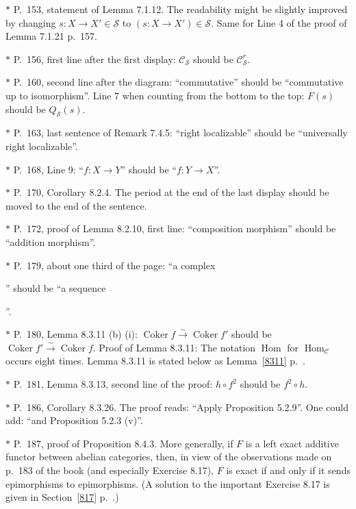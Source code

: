 \documentclass[12pt]{article}
\theoremstyle{remark}
\theoremstyle{definition}
\newcommand{\nn}{\noindent}
\newcommand{\cc}{\mathcal}
\newcommand{\C}{\mathcal C}
\newcommand{\xr}{\xrightarrow}
\DeclareMathOperator{\Coker}{Coker}
\DeclareMathOperator{\Hom}{Hom}
\begin{document}
\nn$*$ P.~153, statement of Lemma 7.1.12. The readability might be slightly improved by changing $s:X\to X'\in\mathcal S$ to $(s:X\to X')\in\mathcal S$. Same for Line 4 of the proof of Lemma 7.1.21 p.~157.

\nn$*$ P.~156, first line after the first display: $\C_{\cc S}$ should be $\C_{\cc S}^r$.

\nn$*$ P.~160, second line after the diagram: ``commutative'' should be ``commutative up to isomorphism''. Line 7 when counting from the bottom to the top: $F(s)$ should be $Q_{\mathcal S}(s)$.

\nn$*$ P.~163, last sentence of Remark 7.4.5: ``right localizable'' should be ``universally right localizable''.

\nn$*$ P.~168, Line 9: ``$f:X\to Y$'' should be ``$f:Y\to X$''.

\nn$*$ P.~170, Corollary 8.2.4. The period at the end of the last display should be moved to the end of the sentence.

\nn$*$ P.~172, proof of Lemma 8.2.10, first line: ``composition morphism'' should be ``addition morphism''.

\nn$*$ P.~179, about one third of the page: ``a complex 
'' 
should be ``a sequence 
''.

\nn$*$ P.~180, Lemma 8.3.11 (b) (i): $\Coker f\xr\sim\Coker f'$ should be $\Coker f'\xr\sim\Coker f$. Proof of Lemma 8.3.11: The notation $\Hom$ for $\Hom_\C$ occurs eight times. Lemma 8.3.11 is stated below as Lemma~\ref{8311} p.~\pageref{8311}. 

\nn$*$ P.~181, Lemma 8.3.13, second line of the proof: $h\circ f^2$ should be $f^2\circ h$.

\nn$*$ P.~186, Corollary 8.3.26. The proof reads: ``Apply Proposition 5.2.9''. One could add: ``and Proposition 5.2.3 (v)''.

\nn$*$ P.~187, proof of Proposition 8.4.3. More generally, if $F$ is a left exact additive functor between abelian categories, then, in view of the observations made on p.~183 of the book (and especially Exercise 8.17), $F$ is exact if and only if it sends epimorphisms to epimorphisms. (A solution to the important Exercise 8.17 is given in Section~\ref{817} p.~\pageref{817}.)
\end{document}
